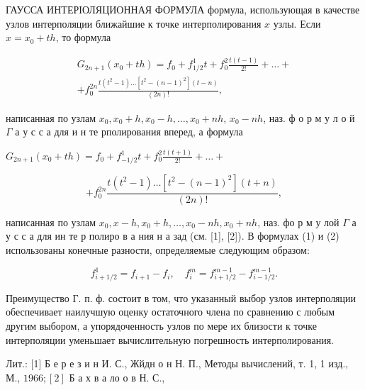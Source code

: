 \documentclass[10pt]{article}
\begin{document}
ГАУССА ИНТЕРІОЛЯЦИОННАЯ ФОРМУЛА формула, использующая в качестве узлов интерполяции ближайшие к точке интерполирования $x$ узлы. Если $x=x_{0}+t h$, то формула



\[

\begin{gathered}

G_{2 n+1}\left(x_{0}+t h\right)=f_{0}+f_{1 / 2}^{1} t+f_{0}^{2} \frac{t(t-1)}{2 !}+\ldots+ \\

+f_{0}^{2 n} \frac{t\left(t^{2}-1\right) \ldots\left[t^{2}-(n-1)^{2}\right](t-n)}{(2 n) !},

\end{gathered}

\]



написанная по узлам $x_{0}, x_{0}+h, x_{0}-h, \ldots, x_{0}+n h$, $x_{0}-n h$, наз. ф о р м у л о й $\Gamma$ а у с с а для и н те рполирования вперед, а формула



$G_{2 n+1}\left(x_{0}+t h\right)=f_{0}+f_{-1 / 2}^{1} t+f_{0}^{2} \frac{t(t+1)}{2 !}+\ldots+$



\[

+f_{0}^{2 n} \frac{t\left(t^{2}-1\right) \ldots\left[t^{2}-(n-1)^{2}\right](t+n)}{(2 n) !},

\]



написанная по узлам $x_{0}, x-h, x_{0}+h, \ldots, x_{0}-n h, x_{0}+n h$, наз. фо р м у лой $\Gamma$ а у с с а для ин те р полиро в а ния н а зад (см. [1], [2]). В формулах (1) и (2) использованы конечные разности, определяемые следующим образом:



\[

f_{i+1 / 2}^{1}=f_{i+1}-f_{i}, \quad f_{i}^{m}=f_{i+1 / 2}^{m-1}-f_{i-1 / 2}^{m-1} .

\]



Преимущество Г. п. ф. состоит в том, что указанный выбор узлов интерполяции обеспечивает наилучшую оценку остаточного члена по сравнению с любым другим выбором, а упорядоченность узлов по мере их близости к точке интерполяции уменьшает вычислительную погрешность интерполирования.



Лит.: [1] Б е р е з и н И. С., Жйдн о н Н. П., Методы вычислений, т. 1, 1 изд., М., $1966 ;[2]$ Б а х в а ло о в Н. С.,
\end{document}

